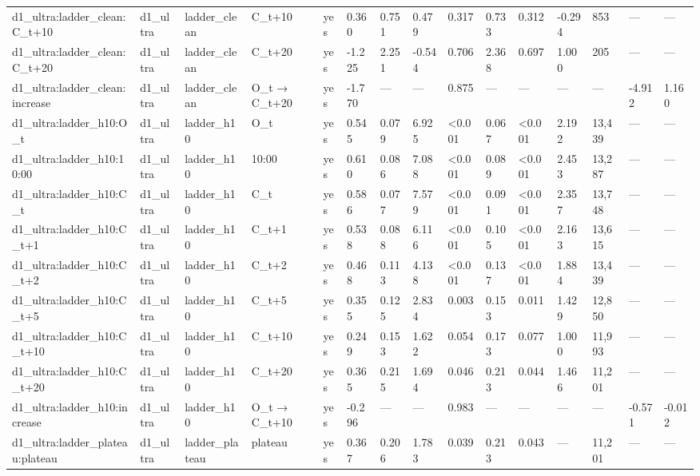 \begin{tabular}{lllllllllllllll}
d1\_ultra:ladder\_clean:C\_t+10 & d1\_ultra & ladder\_clean & C\_t+10 & yes & 0.360 & 0.751 & 0.479 & 0.317 & 0.733 & 0.312 & -0.294 & 853 & — & — \\
d1\_ultra:ladder\_clean:C\_t+20 & d1\_ultra & ladder\_clean & C\_t+20 & yes & -1.225 & 2.251 & -0.544 & 0.706 & 2.368 & 0.697 & 1.000 & 205 & — & — \\
d1\_ultra:ladder\_clean:increase & d1\_ultra & ladder\_clean & O\_t → C\_t+20 & yes & -1.770 & — & — & 0.875 & — & — & — & — & -4.912 & 1.160 \\
d1\_ultra:ladder\_h10:O\_t & d1\_ultra & ladder\_h10 & O\_t & yes & 0.545 & 0.079 & 6.925 & <0.001 & 0.067 & <0.001 & 2.192 & 13,439 & — & — \\
d1\_ultra:ladder\_h10:10:00 & d1\_ultra & ladder\_h10 & 10:00 & yes & 0.610 & 0.086 & 7.088 & <0.001 & 0.089 & <0.001 & 2.453 & 13,287 & — & — \\
d1\_ultra:ladder\_h10:C\_t & d1\_ultra & ladder\_h10 & C\_t & yes & 0.586 & 0.077 & 7.579 & <0.001 & 0.091 & <0.001 & 2.357 & 13,748 & — & — \\
d1\_ultra:ladder\_h10:C\_t+1 & d1\_ultra & ladder\_h10 & C\_t+1 & yes & 0.538 & 0.088 & 6.116 & <0.001 & 0.105 & <0.001 & 2.163 & 13,615 & — & — \\
d1\_ultra:ladder\_h10:C\_t+2 & d1\_ultra & ladder\_h10 & C\_t+2 & yes & 0.468 & 0.113 & 4.138 & <0.001 & 0.137 & <0.001 & 1.884 & 13,439 & — & — \\
d1\_ultra:ladder\_h10:C\_t+5 & d1\_ultra & ladder\_h10 & C\_t+5 & yes & 0.355 & 0.125 & 2.834 & 0.003 & 0.153 & 0.011 & 1.429 & 12,850 & — & — \\
d1\_ultra:ladder\_h10:C\_t+10 & d1\_ultra & ladder\_h10 & C\_t+10 & yes & 0.249 & 0.153 & 1.622 & 0.054 & 0.173 & 0.077 & 1.000 & 11,993 & — & — \\
d1\_ultra:ladder\_h10:C\_t+20 & d1\_ultra & ladder\_h10 & C\_t+20 & yes & 0.365 & 0.215 & 1.694 & 0.046 & 0.213 & 0.044 & 1.466 & 11,201 & — & — \\
d1\_ultra:ladder\_h10:increase & d1\_ultra & ladder\_h10 & O\_t → C\_t+10 & yes & -0.296 & — & — & 0.983 & — & — & — & — & -0.571 & -0.012 \\
d1\_ultra:ladder\_plateau:plateau & d1\_ultra & ladder\_plateau & plateau & yes & 0.367 & 0.206 & 1.783 & 0.039 & 0.213 & 0.043 & — & 11,201 & — & — \\
\bottomrule
\end{tabular}
